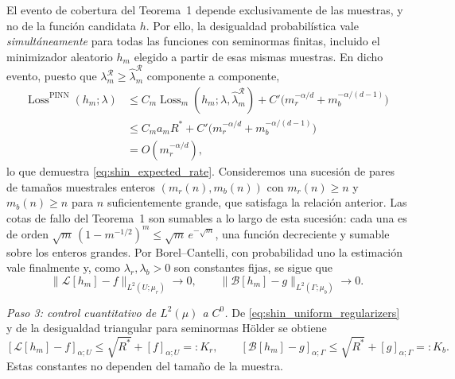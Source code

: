 El evento de cobertura del Teorema~1 depende exclusivamente de las muestras,
y no de la función candidata $h$. Por ello, la desigualdad probabilística
vale \emph{simultáneamente} para todas las funciones con seminormas finitas,
incluido el minimizador aleatorio $h_m$ elegido a partir de esas mismas
muestras. En dicho evento, puesto que
$\lambda_m^{\mathcal R}\geq\hat\lambda_m^{\mathcal R}$ componente a componente,
\begin{align*}
\operatorname{Loss}^{\mathrm{PINN}}(h_m;\lambda)
&\leq C_m\operatorname{Loss}_m(h_m;\lambda,\hat\lambda_m^{\mathcal R})
 +C'\bigl(m_r^{-\alpha/d}+m_b^{-\alpha/(d-1)}\bigr)\\
&\leq C_ma_mR^*
 +C'\bigl(m_r^{-\alpha/d}+m_b^{-\alpha/(d-1)}\bigr)\\
&=O(m_r^{-\alpha/d}),
\end{align*}
lo que demuestra \eqref{eq:shin_expected_rate}. Consideremos una sucesión de pares de tamaños muestrales enteros
$(m_r(n),m_b(n))$ con $m_r(n)\geq n$ y $m_b(n)\geq n$ para $n$
suficientemente grande, que satisfaga la relación anterior. Las cotas de fallo
del Teorema~1 son sumables a lo largo de esta sucesión: cada una es de orden
$\sqrt m\,(1-m^{-1/2})^m\leq\sqrt m\,e^{-\sqrt m}$,
una función decreciente y sumable sobre los enteros grandes. Por Borel--Cantelli, con probabilidad uno la estimación vale finalmente y, como
$\lambda_r,\lambda_b>0$ son constantes fijas, se sigue que
\begin{equation}\label{eq:shin_L2_convergence}
\|\mathcal L[h_m]-f\|_{L^2(U;\mu_r)}\to0,
\qquad
\|\mathcal B[h_m]-g\|_{L^2(\Gamma;\mu_b)}\to0.
\end{equation}

\smallskip
\noindent\emph{Paso 3: control cuantitativo de $L^2(\mu)$ a $C^0$.}
De \eqref{eq:shin_uniform_regularizers} y de la desigualdad triangular
para seminormas Hölder se obtiene
\begin{equation}\label{eq:uniform_holder_residual}
[\mathcal L[h_m]-f]_{\alpha;U}
\leq\sqrt{R^*}+[f]_{\alpha;U}=:K_r,
\qquad
[\mathcal B[h_m]-g]_{\alpha;\Gamma}
\leq\sqrt{R^*}+[g]_{\alpha;\Gamma}=:K_b.
\end{equation}
Estas constantes no dependen del tamaño de la muestra.


